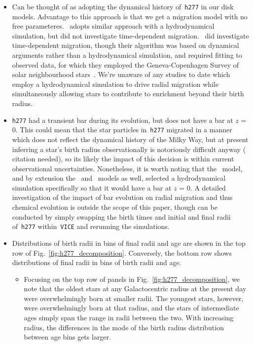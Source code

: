 \documentclass[a4paper, fleqn, usenatbib, useAMS]{mnras}
\begin{document}
\begin{itemize}
	\item Can be thought of as adopting the dynamical history of~\texttt{h277} 
	in our disk models. Advantage to this approach is that we get a migration 
	model with no free parameteres.~\citet{Minchev2013} adopts similar 
	approach with a hydrodynamical simulation, but did not investigate 
	time-dependent migration.~\citet{Schoenrich2009} did investigate 
	time-dependent migration, though their algorithm was based on dynamical 
	arguments rather than a hydrodynamical simulation, and required fitting 
	to observed data, for which they employed the Geneva-Copenhagen Survey of 
	solar neighbourhood stars~\citep{Nordstroem2004b, Holmberg2007}. We're 
	unaware of any studies to date which employ a hydrodynamical simulation 
	to drive radial migration while simultaneously allowing stars to 
	contribute to enrichment beyond their birth radius. 

	\item \texttt{h277} had a transient bar during its evolution, but does 
	not have a bar at $z$ = 0. This could mean that the star particles 
	in~\texttt{h277} migrated in a manner which does not reflect the dynamical 
	history of the Milky Way, but at present inferring a star's birth radius 
	observationally is notoriously difficult anyway ({\color{red} citation 
	needed}), so its likely the impact of this decision is within current 
	observational uncertainties. Nonetheless, it is worth noting that 
	the~\citet{Minchev2013} model, and by extension the~\citet{Minchev2014} 
	and~\citet{Minchev2017} models as well, selected a hydrodynamical 
	simulation specifically so that it would have a bar at $z$ = 0. A detailed 
	investigation of the impact of bar evolution on radial migration and thus 
	chemical evolution is outside the scope of this paper, though can be 
	conducted by simply swapping the birth times and initial and final radii 
	of~\texttt{h277} within~\texttt{VICE} and rerunning the simulations. 

	\item Distributions of birth radii in bins of final radii and age are 
	shown in the top row of Fig.~\ref{fig:h277_decomposition}. Conversely, the 
	bottom row shows distributions of final radii in bins of birth radii and 
	age. 
	\begin{itemize} 
		\item Focusing on the top row of panels in 
		Fig.~\ref{fig:h277_decomposition}, we note that the oldest stars at any 
		Galactocentric radius at the present day were overwhelmingly born at 
		smaller radii. The youngest stars, however, were overwhelmingly born at 
		that radius, and the stars of intermediate ages simply span the range 
		in radii between the two. With increasing radius, the differences in 
		the mode of the birth radius distribution between age bins gets larger. 


\end{itemize}
\end{itemize}
\end{document}
